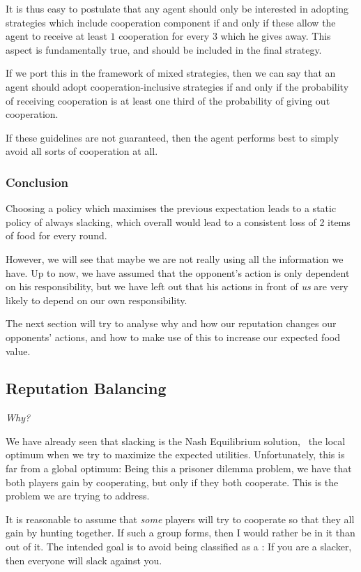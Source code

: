 \documentclass[10pt,fleqn]{article}
\begin{document}
It is thus easy to postulate that any agent should only be interested in
adopting strategies which include cooperation component if and only if these
allow the agent to receive at least $1$ cooperation for every $3$ which he gives
away. This aspect is fundamentally true, and should be included in the final
strategy.

If we port this in the framework of mixed strategies, then we can say that an
agent should adopt cooperation-inclusive strategies if and only if the
probability of receiving cooperation is at least one third of the probability of
giving out cooperation.

If these guidelines are not guaranteed, then the agent performs best to simply
avoid all sorts of cooperation at all.


\subsubsection{Conclusion}
Choosing a policy which maximises the previous expectation leads to a static
policy of always slacking, which overall would lead to a consistent loss of 2
items of food for every round.

However, we will see that maybe we are not really using all the information we
have. Up to now, we have assumed that the opponent's action is only dependent on
his responsibility, but we have left out that his actions in front of \emph{us}
are very likely to depend on our own responsibility.

The next section will try to analyse why and how our reputation changes our
opponents' actions, and how to make use of this to increase our expected food
value.

\subsection{Reputation Balancing}
\emph{Why?}

We have already seen that slacking is the Nash Equilibrium solution, \ie\ the
local optimum when we try to maximize the expected utilities. Unfortunately,
this is far from a global optimum: Being this a prisoner dilemma problem, we
have that both players gain by cooperating, but only if they both cooperate.
This is the problem we are trying to address.

It is reasonable to assume that \emph{some} players will try to cooperate so
that they all gain by hunting together. If such a group forms, then I would
rather be in it than out of it. The intended goal is to avoid being classified
as a : If you are a slacker, then everyone will slack against you.
\end{document}

